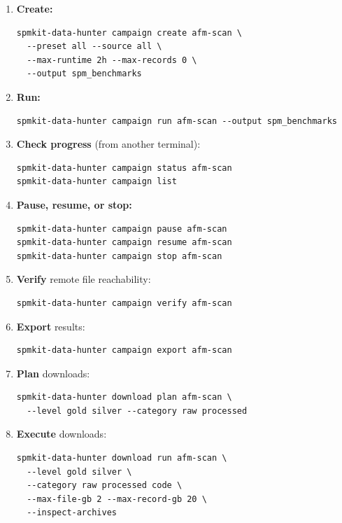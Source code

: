 \documentclass[11pt,a4paper]{article}
\begin{document}
\begin{enumerate}[nosep]
  \item \textbf{Create:}
\begin{lstlisting}
spmkit-data-hunter campaign create afm-scan \
  --preset all --source all \
  --max-runtime 2h --max-records 0 \
  --output spm_benchmarks
\end{lstlisting}

  \item \textbf{Run:}
\begin{lstlisting}
spmkit-data-hunter campaign run afm-scan --output spm_benchmarks
\end{lstlisting}

  \item \textbf{Check progress} (from another terminal):
\begin{lstlisting}
spmkit-data-hunter campaign status afm-scan
spmkit-data-hunter campaign list
\end{lstlisting}

  \item \textbf{Pause, resume, or stop:}
\begin{lstlisting}
spmkit-data-hunter campaign pause afm-scan
spmkit-data-hunter campaign resume afm-scan
spmkit-data-hunter campaign stop afm-scan
\end{lstlisting}

  \item \textbf{Verify} remote file reachability:
\begin{lstlisting}
spmkit-data-hunter campaign verify afm-scan
\end{lstlisting}

  \item \textbf{Export} results:
\begin{lstlisting}
spmkit-data-hunter campaign export afm-scan
\end{lstlisting}

  \item \textbf{Plan} downloads:
\begin{lstlisting}
spmkit-data-hunter download plan afm-scan \
  --level gold silver --category raw processed
\end{lstlisting}

  \item \textbf{Execute} downloads:
\begin{lstlisting}
spmkit-data-hunter download run afm-scan \
  --level gold silver \
  --category raw processed code \
  --max-file-gb 2 --max-record-gb 20 \
  --inspect-archives
\end{lstlisting}
\end{enumerate}
\end{document}
